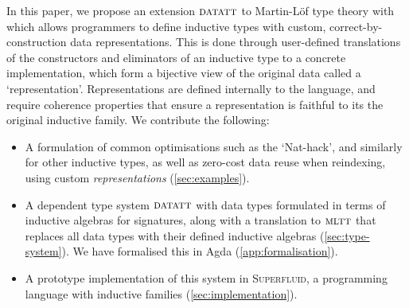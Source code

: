 In this paper, we propose an extension ${\textsc{datatt}}$ to Martin-L\"of type theory \cite{Martin-Lof1984-pz} with
which allows programmers to define inductive types with custom,
correct-by-construction data representations. This is done through user-defined
translations of the constructors and eliminators of an inductive type to a
concrete implementation, which form a bijective view of the original data called
a `representation'. Representations are defined internally to the language, and
require coherence properties that ensure a representation is faithful to its the
original inductive family. We contribute the following:
\begin{itemize}
    \item A formulation of common optimisations such as the `Nat-hack', and
        similarly for other inductive types, as well as zero-cost data reuse when
        reindexing, using custom \emph{representations} (\cref{sec:examples}).
        \item A dependent type system ${\textsc{datatt}}$ with data types formulated
        in terms of inductive algebras for signatures, along with a translation to
        ${\textsc{mltt}}$ that replaces all data types with their defined inductive
        algebras (\cref{sec:type-system}). We have formalised this in Agda (\cref{app:formalisation}).
        \item A prototype implementation of this system in \textsc{Superfluid},
        a programming language with inductive families (\cref{sec:implementation}).
\end{itemize}
